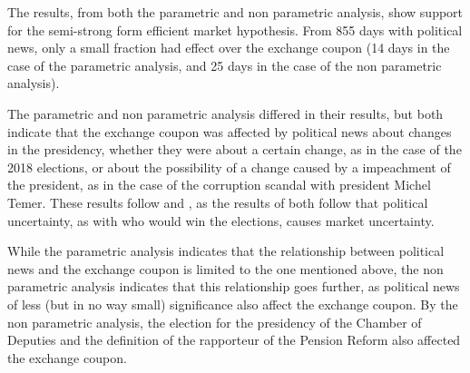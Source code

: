 \documentclass[a4paper]{article}
\begin{document}
The results, from both the parametric and non parametric analysis, show support for the semi-strong form efficient market hypothesis. From 855 days with political news, only a small fraction had effect over the exchange coupon (14 days in the case of the parametric analysis, and 25 days in the case of the non parametric analysis).

The parametric and non parametric analysis differed in their results, but both indicate that the exchange coupon was affected by political news about changes in the presidency, whether they were about a certain change, as in the case of the 2018 elections, or about the possibility of a change caused by a impeachment of the president, as in the case of the corruption scandal with president Michel Temer. These results follow \cite{smales2015} and \cite{marquessantos2016}, as the results of both follow that political uncertainty, as with who would win the elections, causes market uncertainty.

While the parametric analysis indicates that the relationship between political news and the exchange coupon is limited to the one mentioned above, the non parametric analysis indicates that this relationship goes further, as political news of less (but in no way small) significance also affect the exchange coupon. By the non parametric analysis, the election for the presidency of the Chamber of Deputies and the definition of the rapporteur of the Pension Reform also affected the exchange coupon.





\begin{comment}

The best forecast for the asset price in the next period is always the current price. (quem disse isso? acho que propio Fama)
The best estimate for the asset return in the long term is always the normal return for the risk of the asset (quem fisse isso?)

\end{comment}
\end{document}
